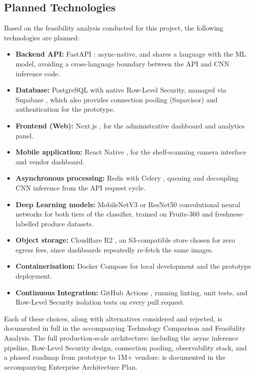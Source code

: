 \documentclass[12pt,a4paper]{article}
\begin{document}
\subsection{Planned Technologies}

Based on the feasibility analysis conducted for this project, the following technologies are planned:

\begin{itemize}[leftmargin=1.2cm]
    \item \textbf{Backend API:} FastAPI \cite{fastapi}: async-native, and shares a language with the ML model, avoiding a cross-language boundary between the API and CNN inference code.
    \item \textbf{Database:} PostgreSQL \cite{postgres} with native Row-Level Security, managed via Supabase \cite{supabase}, which also provides connection pooling (Supavisor) and authentication for the prototype.
    \item \textbf{Frontend (Web):} Next.js \cite{nextjs}, for the administrative dashboard and analytics panel.
    \item \textbf{Mobile application:} React Native \cite{reactnative}, for the shelf-scanning camera interface and vendor dashboard.
    \item \textbf{Asynchronous processing:} Redis with Celery \cite{redis}, queuing and decoupling CNN inference from the API request cycle.
    \item \textbf{Deep Learning models:} MobileNetV3 or ResNet50 convolutional neural networks for both tiers of the classifier, trained on Fruits-360 \cite{fruits360} and freshness-labelled produce datasets.
    \item \textbf{Object storage:} Cloudflare R2 \cite{r2}, an S3-compatible store chosen for zero egress fees, since dashboards repeatedly re-fetch the same images.
    \item \textbf{Containerisation:} Docker Compose \cite{docker} for local development and the prototype deployment.
    \item \textbf{Continuous Integration:} GitHub Actions \cite{githubactions}, running linting, unit tests, and Row-Level Security isolation tests on every pull request.
\end{itemize}

Each of these choices, along with alternatives considered and rejected, is documented in full in the accompanying Technology Comparison and Feasibility Analysis. The full production-scale architecture: including the async inference pipeline, Row-Level Security design, connection pooling, observability stack, and a phased roadmap from prototype to 1M+ vendors: is documented in the accompanying Enterprise Architecture Plan.
\end{document}
